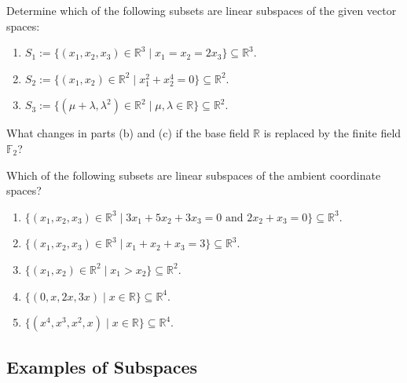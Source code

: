 \begin{exercise}
\label{exc:verifying_subspaces_r_f2}
Determine which of the following subsets are linear subspaces of the given vector spaces:
\begin{enumerate}
    \item $S_1 := \{(x_1, x_2, x_3) \in \mathbb{R}^3 \mid x_1 = x_2 = 2x_3\} \subseteq \mathbb{R}^3$.
    \item $S_2 := \{(x_1, x_2) \in \mathbb{R}^2 \mid x_1^2 + x_2^4 = 0\} \subseteq \mathbb{R}^2$.
    \item $S_3 := \{(\mu + \lambda, \lambda^2) \in \mathbb{R}^2 \mid \mu, \lambda \in \mathbb{R}\} \subseteq \mathbb{R}^2$.
\end{enumerate}
What changes in parts (b) and (c) if the base field $\mathbb{R}$ is replaced by the finite field $\mathbb{F}_2$?
\end{exercise}

\begin{exercise}
\label{exc:subspace_identification_mc}
Which of the following subsets are linear subspaces of the ambient coordinate spaces?
\begin{enumerate}
    \item $\{(x_1, x_2, x_3) \in \mathbb{R}^3 \mid 3x_1 + 5x_2 + 3x_3 = 0 \text{ and } 2x_2 + x_3 = 0\} \subseteq \mathbb{R}^3$.
    \item $\{(x_1, x_2, x_3) \in \mathbb{R}^3 \mid x_1 + x_2 + x_3 = 3\} \subseteq \mathbb{R}^3$.
    \item $\{(x_1, x_2) \in \mathbb{R}^2 \mid x_1 > x_2\} \subseteq \mathbb{R}^2$.
    \item $\{(0, x, 2x, 3x) \mid x \in \mathbb{R}\} \subseteq \mathbb{R}^4$.
    \item $\{(x^4, x^3, x^2, x) \mid x \in \mathbb{R}\} \subseteq \mathbb{R}^4$.
\end{enumerate}
\end{exercise}

\subsection{Examples of Subspaces}

